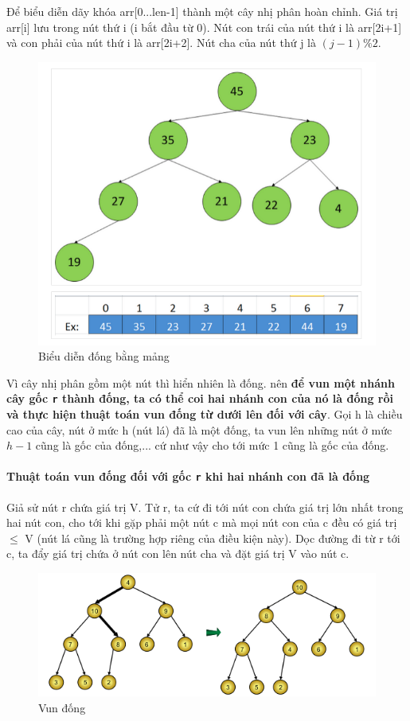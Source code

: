 \documentclass[8pt, a4paper]{article}
\begin{document}
Để biểu diễn dãy khóa arr[0...len-1] thành một cây nhị phân hoàn chỉnh. Giá trị arr[i] lưu trong nút thứ i (i bắt đầu từ 0). Nút con trái của nút thứ i là arr[2i+1] và con phải của nút thứ i là arr[2i+2]. Nút cha của nút thứ j là $(j-1) \% 2$.
\begin{figure}[htp]
\centering
\includegraphics[scale=0.40]{img/bddong.png}
\caption{Biểu diễn đống bằng mảng}
\label{mangdong}
\end{figure}

Vì cây nhị phân gồm một nút thì hiển nhiên là đống. nên \textbf{để vun một nhánh cây gốc \texttt{r} thành đống, ta có thể coi hai nhánh con của nó là đống rồi và thực hiện thuật toán vun đống từ dưới lên đối với cây}. Gọi h là chiều cao của cây, nút ở mức h (nút lá) đã là một đống, ta vun lên những nút ở mức $h-1$ cũng là gốc của đống,... cứ như vậy cho tới mức 1 cũng là gốc của đống.

\paragraph{Thuật toán vun đống đối với gốc \texttt{r} khi hai nhánh con đã là đống}
Giả sử nút r chứa giá trị V. Tử r, ta cứ đi tới nút con chứa giá trị lớn nhất trong hai nút con, cho tới khi gặp phải một nút c mà mọi nút con của c đều có giá trị $ \le $ V (nút lá cũng là trường hợp riêng của điều kiện này). Dọc đường đi từ r tới c, ta đẩy giá trị chứa ở nút con lên nút cha và đặt giá trị V vào nút c.
\begin{figure}[htp]
\centering
\includegraphics[scale=0.50]{img/buildheap.png}
\caption{Vun đống}
\label{}
\end{figure}
\end{document}
